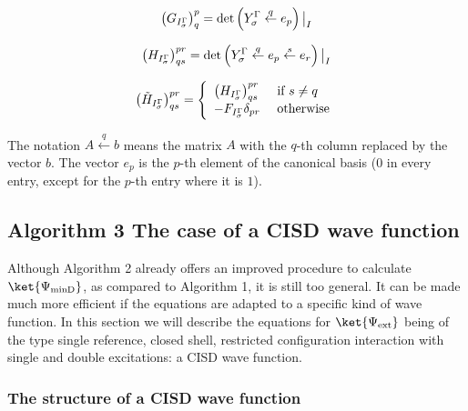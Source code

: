 \documentclass[a4paper,11pt]{article}
\begin{document}
\begin{equation}
  \big( G_{I_\sigma^{\Gamma}} \big)^p_q = \text{det} \left( Y_\sigma^{\Gamma} \overset{q}{\leftarrow} e_p \right) \big|_I
\end{equation}

\begin{equation}
  \big( H_{I_\sigma^{\Gamma}} \big)^{pr}_{qs} =
  \text{det} \left( Y_\sigma^{\Gamma} \overset{q}{\leftarrow} e_p
    \overset{s}{\leftarrow} e_r \right) \big|_I
\end{equation}

\begin{equation}
  \big( \tilde{H}_{I_\sigma^{\Gamma}} \big)^{pr}_{qs} =
  \left\{
    \begin{array}{ll}
      \big( H_{I_\sigma^{\Gamma}} \big)^{pr}_{qs} & \text{ if } s \ne q\\
      -F_{I_\sigma^{\Gamma}} \delta_{pr} & \text{ otherwise}
    \end{array}
  \right.
\end{equation}

The notation $A \overset{q}{\leftarrow}b$ means the matrix $A$ with the $q$-th column replaced by the vector $b$.
The vector $e_p$ is the $p$-th element of the canonical basis ($0$ in every entry, except for the $p
$-th entry where it is $1$).


\subsection{\textsf{\LARGE Algorithm 3} The case of a CISD wave function}

Although Algorithm 2 already offers an improved procedure to calculate $\ket{\Psi_\text{minD}}$, as compared to Algorithm 1, it is still too general.
It can be made much more efficient if the equations are adapted to a specific kind of wave function.
In this section we will describe the equations for $\ket{\Psi_\text{ext}}$ being of the type single reference, closed shell, restricted configuration interaction with single and double excitations: a CISD wave function.

\subsubsection{The structure of a CISD wave function}
\label{sec:struct_cisd_wf}
\end{document}
